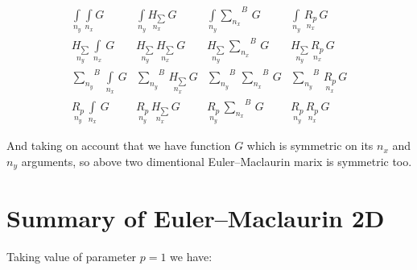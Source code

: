 \documentclass[11pt]{article}
\begin{document}
    \begin{equation}
\begin{array}{cccc}
 \int\limits_{n_y}^{} \int\limits_{n_x}^{} G  &  \int\limits_{n_y}^{} \underset{n_x}{H_{\sum}}\,G  &  \int\limits_{n_y}^{}{\sum\limits_{n_x}^{}}^{B}\,G  &  \int\limits_{n_y}^{}\,\underset{n_x}{R_{p}}\,G  \\
 \underset{n_y}{H_{\sum}}\,\int\limits_{n_x}^{}\,G &  \underset{n_y}{H_{\sum}}\,\underset{n_x}{H_{\sum}}\,G &  \underset{n_y}{H_{\sum}}\,{\sum\limits_{n_x}^{}}^{B}\,G &  \underset{n_y}{H_{\sum}}\,\underset{n_x}{R_{p}}\,G \\
 {\sum\limits_{n_y}^{}}^{B}\,\int\limits_{n_x}^{}\,G  &  {\sum\limits_{n_y}^{}}^{B}\,\underset{n_x}{H_{\sum}}\,G  &  {\sum\limits_{n_y}^{}}^{B}\,{\sum\limits_{n_x}^{}}^{B}\,G  &  {\sum\limits_{n_y}^{}}^{B}\,\underset{n_x}{R_{p}}\,G  \\
 \underset{n_y}{R_{p}}\,\int\limits_{n_x}^{}\,G   &  \underset{n_y}{R_{p}}\,\underset{n_x}{H_{\sum}}\,G   &  \underset{n_y}{R_{p}}\,{\sum\limits_{n_x}^{}}^{B}\,G   &  \underset{n_y}{R_{p}}\,\underset{n_x}{R_{p}}\,G
\end{array}\end{equation}

    And taking on account that we have function \(G\) which is symmetric on
its \(n_x\) and \(n_y\) arguments, so above two dimentional
Euler--Maclaurin marix is symmetric too.

    \section{Summary of Euler--Maclaurin
2D}\label{summary-of-eulermaclaurin-2d}

Taking value of parameter \(p = 1\) we have:
\end{document}
